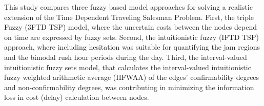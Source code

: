 This study compares three fuzzy based model approaches for solving a realistic extension of the Time Dependent Traveling Salesman Problem. First, the triple Fuzzy (3FTD TSP) model, where the uncertain costs between the nodes depend on time are expressed by fuzzy sets. Second, the intuitionistic fuzzy (IFTD TSP) approach, where including hesitation was suitable for quantifying the jam regions and the bimodal rush hour periods during the day. Third, the interval-valued intuitionistic fuzzy sets model, that calculates the interval-valued intuitionistic fuzzy weighted arithmetic average (IIFWAA) of the edges' confirmability degrees and non-confirmability degrees, was contributing in minimizing the information loss in cost (delay) calculation between nodes.



